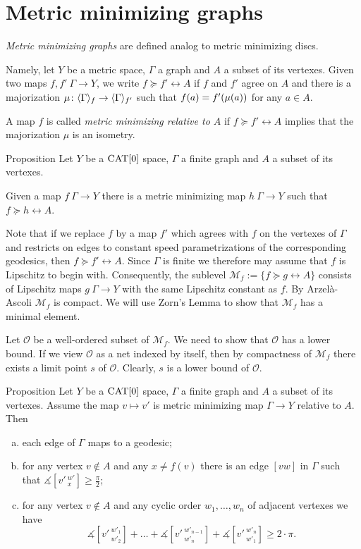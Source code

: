 \section{Metric minimizing graphs}\label{Metric minimizing graphs}

\emph{Metric minimizing graphs} are defined analog to metric minimizing discs.

Namely, let $Y$ be a metric space, $\Gamma$ a graph and $A$ a subset of its vertexes.
Given two maps $f,f'\:\Gamma\to Y$, we write $f\succcurlyeq f'\rel A$ if $f$ and $f'$ agree on $A$ 
and there is a majorization $\mu\colon\langle\Gamma\rangle_f\to \langle\Gamma\rangle_{f'}$
such that $f(a)\zz=f'(\mu(a))$ for any $a\in A$.

A map $f$ is called \emph{metric minimizing relative to $A$} if $f\succcurlyeq f'\rel A$ implies that the majorization $\mu$ is an isometry.

\begin{thm}{Proposition}\label{prop:metric-min-graph-exist}
Let $Y$ be a $\mathop{\rm CAT}\nolimits[0]$ space, 
$\Gamma$ a finite  graph and $A$ a subset of its vertexes.

Given a map $f\:\Gamma\to Y$ there is a metric minimizing map $h\:\Gamma\to Y$
such that $f\succcurlyeq h\rel A$.
\end{thm}

Note that if we replace $f$ by a map $f'$ which agrees with $f$ on the vertexes of $\Gamma$ and
restricts on edges to constant speed parametrizations of the corresponding geodesics, then
$f\succcurlyeq f'\rel A$. Since $\Gamma$ is finite we therefore may assume that $f$ is Lipschitz to begin with.
Consequently, the sublevel $\mathcal{M}_f:=\{f\succcurlyeq g\rel A\}$ consists of Lipschitz maps $g\: \Gamma\to Y$ with the same Lipschitz
constant as $f$. By Arzel\`a-Ascoli $\mathcal{M}_f$ is compact.
 We will use Zorn's Lemma to show that 
$\mathcal{M}_f$ has a minimal element.

Let $\mathcal{O}$ be a well-ordered subset of $\mathcal{M}_f$. 
We need to show that $\mathcal{O}$ has a lower bound.
If we view $\mathcal{O}$ as a net indexed by itself, then by compactness of 
$\mathcal{M}_f$ there exists a limit point $s$ of $\mathcal{O}$. Clearly, $s$
is a lower bound of $\mathcal{O}$.
\qeds

\begin{thm}{Proposition}\label{prop:metric-min-graph}
Let $Y$ be a $\mathop{\rm CAT}\nolimits[0]$ space, 
$\Gamma$ a finite  graph and $A$ a subset of its vertexes.
Assume the map $v\mapsto v'$ is metric minimizing map $\Gamma\to Y$ relative to $A$.
Then
\begin{enumerate}[(a)]
\item each edge of $\Gamma$ maps to a geodesic;
\item for any vertex $v\notin A$ and any $x\ne f(v)$
there is an edge  $[vw]$ in $\Gamma$ such that
$\measuredangle[v'\,^{w'}_x]\ge \tfrac\pi2$;
\item\label{sum>=2pi} for any vertex $v\notin A$ and any cyclic order $w_1,\dots,w_n$ of adjacent vertexes we have
\[\measuredangle[v'\,^{w'_1}_{w'_2}]+\dots+\measuredangle[v'\,^{w'_{n-1}}_{w'_n}]+\measuredangle[v'\,^{w'_n}_{w'_1}]\ge 2\cdot\pi.\]
\end{enumerate}
\end{thm}

